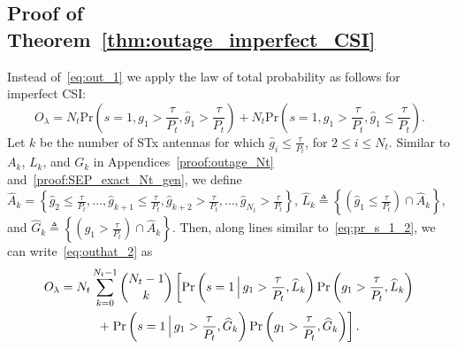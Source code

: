 \documentclass[12pt,draftcls,peerreview,onecolumn]{IEEEtran}
\newcommand{\brac}[1]{\left({#1}\right)}
\newcommand{\define}{\triangleq}
\newcommand{\prob}[1]{\text{Pr}\brac{#1}}
\newcommand{\Given}{\Big\arrowvert}
\newcommand{\nck}[2]{\binom{#1}{#2}}
\newcommand{\setA}{A}
\newcommand{\setAk}{\setA_{k}}
\newcommand{\setAkhat}{\widehat{\setA}_k}
\newcommand{\setG}{G}
\newcommand{\setL}{L}
\newcommand{\setGk}{\setG_k}
\newcommand{\setLk}{\setL_k}
\newcommand{\setGkhat}{\widehat{\setG}_k}
\newcommand{\setLkhat}{\widehat{\setL}_k}
\newcommand{\lam}{\lambda}
\newcommand{\Nt}{{N_t}}
\newcommand{\Pt}{{P_t}}
\newcommand{\puch}{g}
\newcommand{\gk}[1]{{\puch_{#1}}}
\newcommand{\itau}{\tau}
\newcommand{\out}{O}
\newcommand{\taubypt}{\frac{\itau}{\Pt}}
\newcommand{\gkgrtaubypt}[1]{{\gk{#1}}>\taubypt}
\newcommand{\gkhatgrtaubypt}[1]{{\gkhat{#1}}>\taubypt}
\newcommand{\gkhatlttaubypt}[1]{{\gkhat{#1}}\leq\taubypt}
\newcommand{\outlam}{\out_{\lam}}
\newcommand{\ghat}{\hat{\puch}}
\newcommand{\gkhat}[1]{\ghat_{#1}}
\begin{document}
\subsection{Proof of Theorem~\ref{thm:outage_imperfect_CSI}}
\label{proof:outage_imperfect_CSI}
Instead of~\eqref{eq:out_1} we apply the law of total probability as follows for imperfect CSI:
\begin{equation}
\outlam=\Nt\text{Pr}\brac{s=1,\gk{1}>\taubypt,\gkhat{1}>\taubypt} + \Nt\text{Pr}\brac{s=1,\gk{1}>\taubypt,\gkhat{1}\leq\taubypt}.
\label{eq:outhat_2}
\end{equation}
Let $k$ be the number of STx antennas for which $\gkhatlttaubypt{i}$, for $2\leq i \leq\Nt$. Similar to $\setAk$, $\setLk$,  and  $\setGk$ in Appendices~\ref{proof:outage_Nt} and~\ref{proof:SEP_exact_Nt_gen}, we define $\setAkhat=\left\{\gkhatlttaubypt{2},\dots,\gkhatlttaubypt{k+1},\gkhatgrtaubypt{k+2},\dots,\gkhatgrtaubypt{\Nt}\right\}$, $\setLkhat\define\left\{\left(\gkhatlttaubypt{1}\right)\cap\setAkhat \right\}$, and $\setGkhat\define\left\{\left(\gkhatgrtaubypt{1}\right)\cap\setAkhat \right\}$. Then, along lines similar to~\eqref{eq:pr_s_1_2}, we can write~\eqref{eq:outhat_2}  as
%
\begin{multline}
\outlam =\Nt\sum_{k=0}^{\Nt-1}\nck{\Nt-1}{k}\left[ \prob{s = 1 \Given \gkgrtaubypt{1},\setLkhat} \prob{\gkgrtaubypt{1},\setLkhat} \right. \\  +\left.
\prob{s = 1 \Given\gkgrtaubypt{1}, \setGkhat } \prob{\gkgrtaubypt{1},\setGkhat}\right]   . 
\label{eq:pr_s_1_2_imp}
\end{multline}
%
\end{document}
